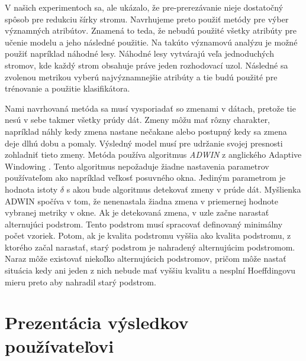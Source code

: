 \par
V našich experimentoch sa, ale ukázalo, že pre-prerezávanie nieje dostatočný spôsob pre redukciu šírky stromu. Navrhujeme preto použiť metódy pre výber významných atribútov. Znamená to teda, že nebudú použité všetky atribúty pre učenie modelu a jeho následné použitie. Na takúto významovú analýzu je možné použiť napríklad náhodné lesy. Náhodné lesy vytvárajú veľa jednoduchých stromov, kde každý strom obsahuje práve jeden rozhodovací uzol. Následné sa zvolenou metrikou vyberú najvýznamnejšie atribúty a tie budú použité pre trénovanie a použitie klasifikátora.
\par
Nami navrhovaná metóda sa musí vysporiadať so zmenami v dátach, pretože tie nesú v sebe takmer všetky prúdy dát. Zmeny môžu mať rôzny charakter, napríklad náhly kedy zmena nastane nečakane alebo postupný kedy sa zmena deje dlhú dobu a pomaly. Výsledný model musí pre udržanie svojej presnosti zohladniť tieto zmeny. Metóda používa algoritmus \textit{ADWIN} z anglického Adaptive Windowing \citep{Hutchison2009}. Tento algoritmus nepožaduje žiadne nastavenia parametrov používateľom ako napríklad veľkosť posuvného okna. Jediným parametrom je hodnota istoty $\delta$ s akou bude algoritmus detekovať zmeny v prúde dát. Myšlienka ADWIN spočíva v tom, že nenenastala žiadna zmena v priemernej hodnote vybranej metriky v okne. Ak je detekovaná zmena, v uzle začne narastať alternujúci podstrom. Tento podstrom musí spracovať definovaný minimálny počet vzoriek. Potom, ak je kvalita podstromu vyššia ako kvalita podstromu, z ktorého začal narastať, starý podstrom je nahradený alternujúcim podstromom. Naraz môže existovať niekoľko alternujúcich podstromov, pričom môže nastať situácia kedy ani jeden z nich nebude mať vyššiu kvalitu a nesplní Hoeffdingovu mieru preto aby nahradil starý podstrom.




\section{Prezentácia výsledkov používateľovi}
\label{my-method-prezentacia-vysledkov}

